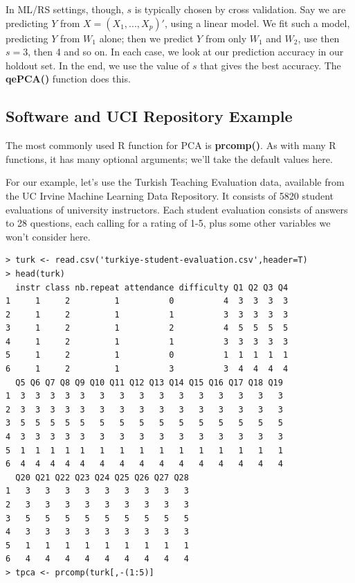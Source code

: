 In ML/RS settings, though, $s$ is typically chosen by 
cross validation.  Say we are predicting $Y$ from $X = (X_1,...,X_p)'$,
using a linear model.  We fit such a model, predicting $Y$
from $W_1$ alone; then we predict $Y$ from only $W_1$ and $W_2$,
use then $s = 3$, then 4 and so on.  In each case, we look at our
prediction accuracy in our holdout set.  In the end, we use the value of
$s$ that gives the best accuracy.  The \textbf{qePCA()} function does
this.


\subsection{Software and UCI Repository Example}

The most commonly used R function for PCA is \textbf{prcomp()}.  As with
many R functions, it has many optional arguments; we'll take the default
values here.

For our example, let's use the Turkish Teaching Evaluation data,
available from the UC Irvine Machine Learning Data Repository.  It
consists of 5820 student evaluations of university instructors.  Each
student evaluation consists of answers to 28 questions, each calling for
a rating of 1-5, plus some other variables we won't consider here.

\begin{lstlisting}
> turk <- read.csv('turkiye-student-evaluation.csv',header=T)
> head(turk)
  instr class nb.repeat attendance difficulty Q1 Q2 Q3 Q4
1     1     2         1          0          4  3  3  3  3
2     1     2         1          1          3  3  3  3  3
3     1     2         1          2          4  5  5  5  5
4     1     2         1          1          3  3  3  3  3
5     1     2         1          0          1  1  1  1  1
6     1     2         1          3          3  4  4  4  4
  Q5 Q6 Q7 Q8 Q9 Q10 Q11 Q12 Q13 Q14 Q15 Q16 Q17 Q18 Q19
1  3  3  3  3  3   3   3   3   3   3   3   3   3   3   3
2  3  3  3  3  3   3   3   3   3   3   3   3   3   3   3
3  5  5  5  5  5   5   5   5   5   5   5   5   5   5   5
4  3  3  3  3  3   3   3   3   3   3   3   3   3   3   3
5  1  1  1  1  1   1   1   1   1   1   1   1   1   1   1
6  4  4  4  4  4   4   4   4   4   4   4   4   4   4   4
  Q20 Q21 Q22 Q23 Q24 Q25 Q26 Q27 Q28
1   3   3   3   3   3   3   3   3   3
2   3   3   3   3   3   3   3   3   3
3   5   5   5   5   5   5   5   5   5
4   3   3   3   3   3   3   3   3   3
5   1   1   1   1   1   1   1   1   1
6   4   4   4   4   4   4   4   4   4
> tpca <- prcomp(turk[,-(1:5)]
\end{lstlisting}

